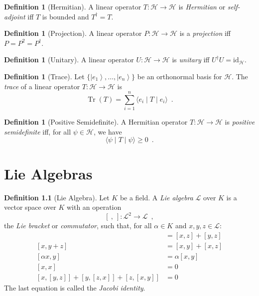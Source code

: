 \documentclass{book}
\theoremstyle{definition}
\newtheorem{df}[prop]{Definition}
\newcommand{\id}[1]{\ensuremath{\mathrm{id}_{#1}}}
\newcommand{\ket}[1]{\ensuremath{\left| {#1} \right\rangle}}
\newcommand{\Tr}{\ensuremath{\operatorname{Tr}}}
\begin{document}
\begin{df}[Hermitian]
A linear operator $T : \mathcal{H} \rightarrow \mathcal{H}$ is \emph{Hermitian} or \emph{self-adjoint} iff $T$ is bounded and $T^\dagger = T$.
\end{df}

\begin{df}[Projection]
A linear operator $P : \mathcal{H} \rightarrow \mathcal{H}$ is a \emph{projection} iff $P = P^2 = P^\dagger$.
\end{df}

\begin{df}[Unitary]
A linear operator $U : \mathcal{H} \rightarrow \mathcal{H}$ is \emph{unitary} iff $U^\dagger U = \id{\mathcal{H}}$.
\end{df}

\begin{df}[Trace]
Let $\{ \ket{e_1}, \ldots, \ket{e_n} \}$ be an orthonormal basis for $\mathcal{H}$. The \emph{trace} of a linear operator $T : \mathcal{H} \rightarrow \mathcal{H}$ is
\[ \Tr(T) = \sum_{i=1}^n \langle e_i \mid T \mid e_i \rangle \enspace . \]
\end{df}


\begin{df}[Positive Semidefinite]
A Hermitian operator $T : \mathcal{H} \rightarrow \mathcal{H}$ is \emph{positive semidefinite} iff, for all $\psi \in \mathcal{H}$, we have
\[ \langle \psi \mid T \mid \psi \rangle \geq 0 \enspace . \]
\end{df}

\chapter{Lie Algebras}

\begin{df}[Lie Algebra]
Let $K$ be a field. A \emph{Lie algebra} $\mathcal{L}$ over $K$ is a vector space over $K$ with an operation
\[ [\ ,\ ] : \mathcal{L}^2 \rightarrow \mathcal{L} \enspace , \]
the \emph{Lie bracket} or \emph{commutator}, such that, for all $\alpha \in K$ and $x,y,z \in \mathcal{L}$:
\begin{align*}
[x+y,z] & = [x,z] + [y,z] \\
[x,y+z] & = [x,y] + [x,z] \\
[\alpha x,y] & = \alpha [x,y] \\
[x,x] & = 0 \\
[x,[y,z]] + [y,[z,x]] + [z,[x,y]] & = 0
\end{align*}
The last equation is called the \emph{Jacobi identity}.
\end{df}
\end{document}
